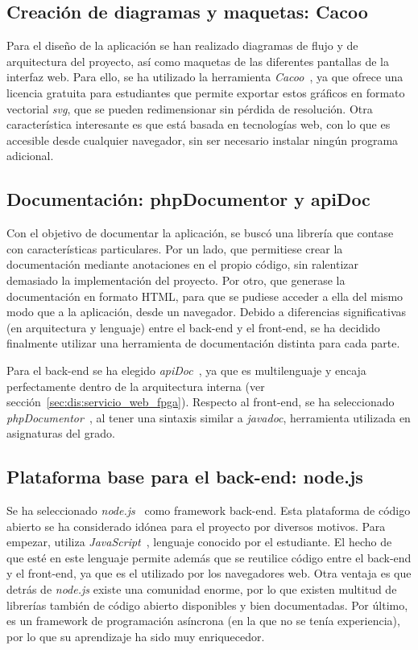 \subsection*{Creación de diagramas y maquetas: Cacoo\label{ssec:dp:cacoo}}

Para el diseño de la aplicación se han realizado diagramas de flujo y de arquitectura del proyecto, así como maquetas de las diferentes pantallas de la interfaz web.
Para ello, se ha utilizado la herramienta \textit{Cacoo}~\cite{cacoo}, ya que ofrece una licencia gratuita para estudiantes que permite exportar estos gráficos en formato vectorial \textit{svg}, que se pueden redimensionar sin pérdida de resolución.
Otra característica interesante es que está basada en tecnologías web, con lo que es accesible desde cualquier navegador, sin ser necesario instalar ningún programa adicional.

\subsection*{Documentación: phpDocumentor y apiDoc\label{ssec:dp:docs}}

Con el objetivo de documentar la aplicación, se buscó una librería que contase con características particulares.
Por un lado, que permitiese crear la documentación mediante anotaciones en el propio código, sin ralentizar demasiado la implementación del proyecto.
Por otro, que generase la documentación en formato \gls{HTML}, para que se pudiese acceder a ella del mismo modo que a la aplicación, desde un navegador.
Debido a diferencias significativas (en arquitectura y lenguaje) entre el \gls{back-end} y el \gls{front-end}, se ha decidido finalmente utilizar una herramienta de documentación distinta para cada parte.

Para el \gls{back-end} se ha elegido \textit{apiDoc}~\cite{apidoc}, ya que es multilenguaje y encaja perfectamente dentro de la arquitectura interna (ver sección~\ref{sec:dis:servicio_web_fpga}).
Respecto al \gls{front-end}, se ha seleccionado \textit{phpDocumentor}~\cite{phpdocumentor}, al tener una sintaxis similar a \textit{javadoc}, herramienta utilizada en asignaturas del grado.

\subsection*{Plataforma base para el \gls{back-end}: node.js\label{ssec:dp:back-end}}

Se ha seleccionado \textit{node.js}~\cite{nodejs} como \gls{framework} \gls{back-end}.
Esta plataforma de código abierto se ha considerado idónea para el proyecto por diversos motivos.
Para empezar, utiliza \textit{JavaScript}~\cite{javascript}, lenguaje conocido por el estudiante.
El hecho de que esté en este lenguaje permite además que se reutilice código entre el \gls{back-end} y el \gls{front-end}, ya que es el utilizado por los navegadores web.
Otra ventaja es que detrás de \textit{node.js} existe una comunidad enorme, por lo que existen multitud de librerías también de código abierto disponibles y bien documentadas.
Por último, es un \gls{framework} de programación asíncrona (en la que no se tenía experiencia), por lo que su aprendizaje ha sido muy enriquecedor.

